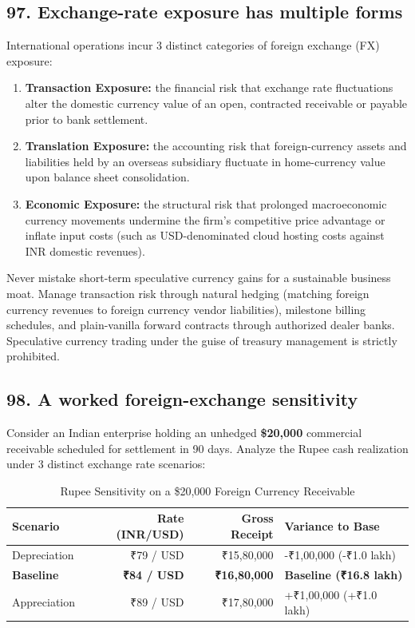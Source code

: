 \subsection{97. Exchange-rate exposure has multiple forms}

International operations incur 3 distinct categories of foreign exchange (FX) exposure:
\begin{enumerate}
    \item \textbf{Transaction Exposure:} the financial risk that exchange rate fluctuations alter the domestic currency value of an open, contracted receivable or payable prior to bank settlement.
    \item \textbf{Translation Exposure:} the accounting risk that foreign-currency assets and liabilities held by an overseas subsidiary fluctuate in home-currency value upon balance sheet consolidation.
    \item \textbf{Economic Exposure:} the structural risk that prolonged macroeconomic currency movements undermine the firm's competitive price advantage or inflate input costs (such as USD-denominated cloud hosting costs against INR domestic revenues).
\end{enumerate}

Never mistake short-term speculative currency gains for a sustainable business moat. Manage transaction risk through natural hedging (matching foreign currency revenues to foreign currency vendor liabilities), milestone billing schedules, and plain-vanilla forward contracts through authorized dealer banks. Speculative currency trading under the guise of treasury management is strictly prohibited.

\subsection{98. A worked foreign-exchange sensitivity}

Consider an Indian enterprise holding an unhedged \textbf{\$20,000} commercial receivable scheduled for settlement in 90 days. Analyze the Rupee cash realization under 3 distinct exchange rate scenarios:

\begin{table}[t]
\centering
\small
\caption{Rupee Sensitivity on a \$20,000 Foreign Currency Receivable}
\label{tab:fx_sensitivity}
\begin{tabularx}{\textwidth}{p{3.2cm} r r X}
\toprule
\textbf{Scenario} & \textbf{Rate (INR/USD)} & \textbf{Gross Receipt} & \textbf{Variance to Base} \\
\midrule
Depreciation & ₹79 / USD & ₹15,80,000 & -₹1,00,000 (-₹1.0 lakh) \\
\textbf{Baseline} & \textbf{₹84 / USD} & \textbf{₹16,80,000} & \textbf{Baseline (₹16.8 lakh)} \\
Appreciation & ₹89 / USD & ₹17,80,000 & +₹1,00,000 (+₹1.0 lakh) \\
\bottomrule
\end{tabularx}
\end{table}

